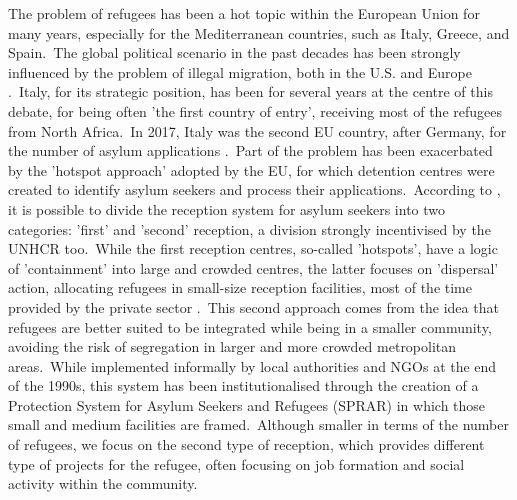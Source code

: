 \documentclass[authoryear,preprint,review,12pt]{elsarticle}
\begin{document}
\noindent
The problem of refugees has been a hot topic within the European Union for many years, especially for the Mediterranean countries, such as Italy, Greece, and Spain.\ The global political scenario in the past decades has been strongly influenced by the problem of illegal migration, both in the U.S. and Europe \citep{bracco2018}.\ Italy, for its strategic position, has been for several years at the centre of this debate, for being often 'the first country of entry', receiving most of the refugees from North Africa.\ In 2017, Italy was the second EU country, after Germany, for the number of asylum applications \citep{campesi2018}.\ Part of the problem has been exacerbated by the 'hotspot approach' adopted by the EU, for which detention centres were created to identify asylum seekers and process their applications.\ According to \cite{campesi2018}, it is possible to divide the reception system for asylum seekers into two categories: 'first' and 'second' reception, a division strongly incentivised by the UNHCR too.\ While the first reception centres, so-called 'hotspots', have a logic of 'containment' into large and crowded centres, the latter focuses on 'dispersal' action, allocating refugees in small-size reception facilities, most of the time provided by the private sector \citep{campesi2018}.\ This second approach comes from the idea that refugees are better suited to be integrated while being in a smaller community, avoiding the risk of segregation in larger and more crowded metropolitan areas.\ While implemented informally by local authorities and NGOs at the end of the 1990s, this system has been institutionalised through the creation of a Protection System for Asylum Seekers and Refugees (SPRAR) in which those small and medium facilities are framed.\ Although smaller in terms of the number of refugees, we focus on the second type of reception, which provides different type of projects for the refugee, often focusing on job formation and social activity within the community.\\
\end{document}

